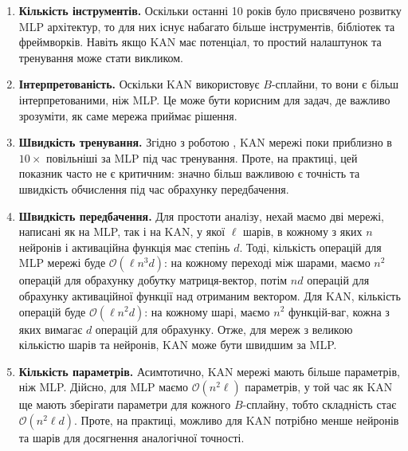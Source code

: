 \begin{enumerate}
	\item \textbf{Кількість інструментів.} Оскільки останні 10 років було
	присвячено розвитку MLP архітектур, то для них існує набагато більше
	інструментів, бібліотек та фреймворків. Навіть якщо KAN має потенціал, то
	простий налаштунок та тренування може стати викликом.
	\item \textbf{Інтерпретованість.} Оскільки KAN використовує $B$-сплайни, то
	вони є більш інтерпретованими, ніж MLP. Це може бути корисним для задач, де
	важливо зрозуміти, як саме мережа приймає рішення.
	\item \textbf{Швидкість тренування.} Згідно з роботою \cite{kan}, KAN мережі
	поки приблизно в $10\times$ повільніші за MLP під час тренування. Проте,
	на практиці, цей показник часто не є критичним: значно більш важливою є
	точність та швидкість обчислення під час обрахунку передбачення.
	\item \textbf{Швидкість передбачення.} Для простоти аналізу, нехай маємо дві
	мережі, написані як на MLP, так і на KAN, у якої $\ell$ шарів, в кожному з
	яких $n$ нейронів і активаційна функція має степінь $d$. Тоді, кількість
	операцій для MLP мережі буде $\mathcal{O}(\ell n^3 d)$: на кожному переході
	між шарами, маємо $n^2$ операцій для обрахунку добутку матриця-вектор, потім
	$nd$ операцій для обрахунку активаційної функції над отриманим вектором. Для
	KAN, кількість операцій буде $\mathcal{O}(\ell n^2 d)$: на кожному шарі,
	маємо $n^2$ функцій-ваг, кожна з яких вимагає $d$ операцій для обрахунку. Отже,
	для мереж з великою кількістю шарів та нейронів, KAN може бути швидшим за MLP.
	\item \textbf{Кількість параметрів.} Асимтотично, KAN мережі мають більше
	параметрів, ніж MLP. Дійсно, для MLP маємо $\mathcal{O}(n^2\ell)$ параметрів,
	у той час як KAN ще мають зберігати параметри для кожного $B$-сплайну, тобто 
	складність стає $\mathcal{O}(n^2\ell d)$. Проте, на практиці, можливо для KAN 
	потрібно менше нейронів та шарів для досягнення аналогічної точності.
\end{enumerate}